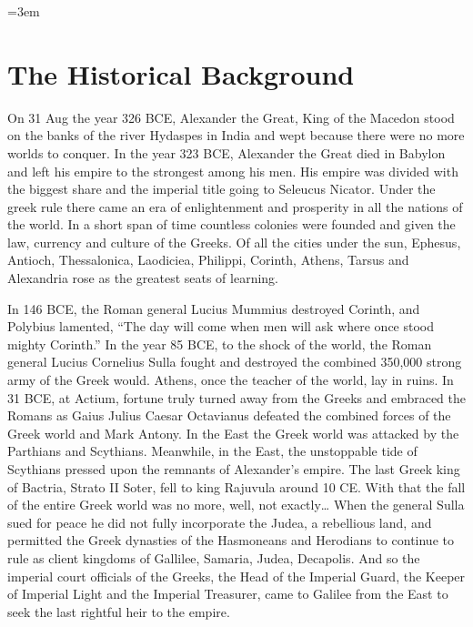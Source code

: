 \hfuzz=5pt %
\emergencystretch=3em %

\section{The Historical Background}\label{par:background-historical}

On 31 Aug the year 326 BCE, Alexander the Great, King of the Macedon stood on the banks of the river Hydaspes in India and wept because there were no more worlds to conquer.
In the year 323 BCE, Alexander the Great died in Babylon and left his empire to the strongest among his men.
His empire was divided with the biggest share and the imperial title going to Seleucus Nicator.
Under the greek rule there came an era of enlightenment and prosperity in all the nations of the world.
In a short span of time countless colonies were founded and given the law, currency and culture of the Greeks.
Of all the cities under the sun, Ephesus, Antioch, Thessalonica, Laodiciea, Philippi, Corinth, Athens, Tarsus and Alexandria rose as the greatest seats of learning.

In 146 BCE, the Roman general Lucius Mummius destroyed Corinth, and Polybius lamented, ``The day will come when men will ask where once stood mighty Corinth.'' In the year 85 BCE, to the shock of the world, the Roman general Lucius Cornelius Sulla fought and destroyed the combined 350,000 strong army of the Greek would.
Athens, once the teacher of the world, lay in ruins.
In 31 BCE, at Actium, fortune truly turned away from the Greeks and embraced the Romans as Gaius Julius Caesar Octavianus defeated the combined forces of the Greek world and Mark Antony.
In the East the Greek world was attacked by the Parthians and Scythians.
Meanwhile, in the East, the unstoppable tide of Scythians pressed upon the remnants of Alexander's empire.
The last Greek king of Bactria, Strato II Soter, fell to king Rajuvula around 10 CE.
With that the fall of the entire Greek world was no more, well, not exactly\ldots{} When the general Sulla sued for peace he did not fully incorporate the Judea, a rebellious land, and permitted the Greek dynasties of the Hasmoneans and Herodians to continue to rule as client kingdoms of Gallilee, Samaria, Judea, Decapolis.
And so the imperial court officials of the Greeks, the Head of the Imperial Guard, the Keeper of Imperial Light and the Imperial Treasurer, came to Galilee from the East to seek the last rightful heir to the empire.

